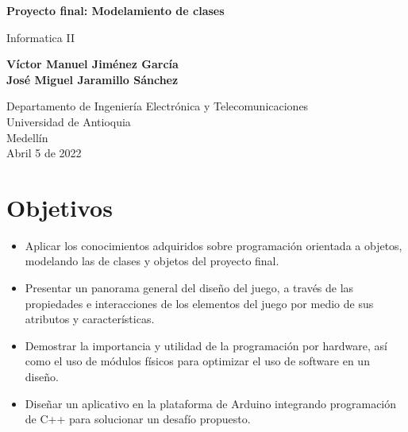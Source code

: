 \documentclass{article}
\begin{document}
\begin{titlepage}
    \begin{center}
        \vspace*{1cm}
            
        \Huge
        \textbf{Proyecto final: Modelamiento de clases}
            
        \vspace{0.5cm}
        \LARGE
        Informatica II
            
        \vspace{1.5cm}
            
        \textbf{Víctor Manuel Jiménez García\\
                José Miguel Jaramillo Sánchez}

        \vfill
            
        \vspace{0.8cm}
            
        \Large
        Departamento de Ingeniería Electrónica y Telecomunicaciones\\
        Universidad de Antioquia\\
        Medellín\\
        Abril 5 de 2022
    \end{center}
\end{titlepage}

\tableofcontents

\newpage
\section{Objetivos}\label{objetivos}
\begin{itemize}
    \item Aplicar los conocimientos adquiridos sobre programación orientada a objetos, modelando las de clases y objetos del proyecto final.
    \item Presentar un panorama general del diseño del juego, a través de las propiedades e interacciones de los elementos del juego por medio de sus atributos y características.
    \item Demostrar la importancia y utilidad de la programación por hardware, así como el uso de módulos físicos para optimizar el uso de software en un diseño.
    \item Diseñar un aplicativo en la plataforma de Arduino integrando programación de C++ para solucionar un desafío  propuesto.
\end{itemize}
\end{document}
